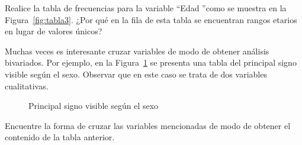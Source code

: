 \documentclass{../prob}
\begin{document}
\begin{problema}
	\begin{parte}
		Realice la tabla de frecuencias para la variable \textquotedblleft Edad \textquotedblright como se muestra en la Figura~\ref{fig:tabla3}. ¿Por qué en la fila de esta tabla se encuentran rangos etarios en lugar de valores únicos? \\		
		
		\noindent{}	

	\end{parte}
		
    \end{problema}
        
    \begin{problema}
    Muchas veces es interesante cruzar variables de modo de obtener análisis bivariados. Por ejemplo, en la Figura~\ref{fig:ej3} se presenta una tabla del principal signo visible según el sexo. Observar que en este caso se trata de dos variables cualitativas.\\
\begin{figure}[!ht]
    \centering
    
    \caption{Principal signo visible según el sexo}
    \label{fig:ej3}
\end{figure}

	Encuentre la forma de cruzar las variables mencionadas de modo de obtener el contenido de la tabla anterior.\\
	
\noindent{}	
	
	\end{problema}
\end{document}

